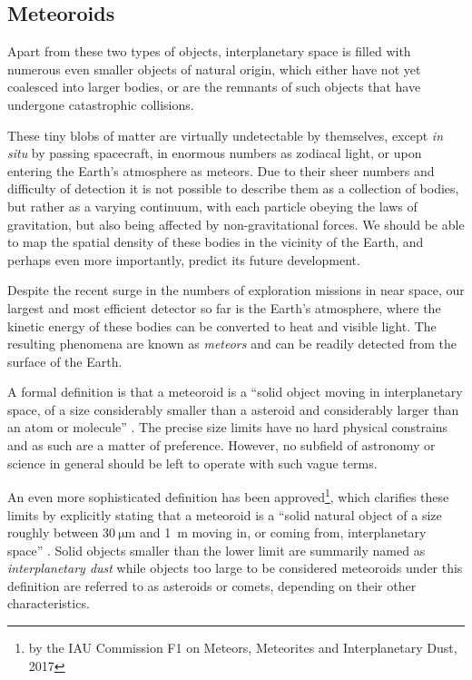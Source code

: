     \subsection{Meteoroids} \label{iam}
        Apart from these two types of objects, interplanetary space is filled with numerous even smaller objects
        of natural origin, which either have not yet coalesced into larger bodies, or are the remnants
        of such objects that have undergone catastrophic collisions.

        These tiny blobs of matter are virtually undetectable by themselves, except \textit{in situ} by passing spacecraft,
        in enormous numbers as zodiacal light, or upon entering the Earth's atmosphere as meteors.
        Due to their sheer numbers and difficulty of detection it is not possible to describe them as a collection of bodies,
        but rather as a varying continuum, with each particle obeying the laws of gravitation, but also being affected by non-gravitational forces.
        We should be able to map the spatial density of these bodies in the vicinity of the Earth,
        and perhaps even more importantly, predict its future development.

        Despite the recent surge in the numbers of exploration missions in near space,
        our largest and most efficient detector so far is the Earth's atmosphere,
        where the kinetic energy of these bodies can be converted to heat and visible light.
        The resulting phenomena are known as \emph{meteors} and can be readily detected from the surface of the Earth.

        A formal definition is that a meteoroid is a ``solid object moving in interplanetary space,
        of a size considerably smaller than a asteroid and considerably larger than an atom or molecule'' \citep{imo-glossary}.
        The precise size limits have no hard physical constrains and as such are a matter of preference.
        However, no subfield of astronomy or science in general should be left to operate with such vague terms.

        An even more sophisticated definition has been approved\footnote{by the IAU Commission F1 on Meteors, Meteorites and Interplanetary Dust, 2017},
        which clarifies these limits by explicitly stating that a meteoroid is a ``solid natural object
        of a size roughly between $\SI{30}{\micro\metre}$ and \SI{1}{\metre} moving in, or coming from, interplanetary space'' \citep{imo-definitions}.
        Solid objects smaller than the lower limit are summarily named as \emph{interplanetary dust} while objects
        too large to be considered meteoroids under this definition are referred to as
        asteroids or comets, depending on their other characteristics.

